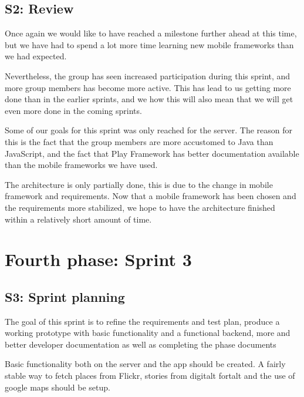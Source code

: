 \documentclass[11pt]{book}
\begin{document}
\subsection{S2: Review}
Once again we would like to have reached a milestone further ahead at this time, but we have had to spend a lot more time learning new mobile frameworks than we had expected. 

Nevertheless, the group has seen increased participation during this sprint, and more group members has become more active. This has lead to us getting more done than in the earlier sprints, and we how this will also mean that we will get even more done in the coming sprints.

Some of our goals for this sprint was only reached for the server. The reason for this is the fact that the group members are more accustomed to Java than JavaScript, and the fact that Play Framework has better documentation available than the mobile frameworks we have used.

The architecture is only partially done, this is due to the change in mobile framework and requirements. Now that a mobile framework has been chosen and the requirements more stabilized, we hope to have the architecture finished within a relatively short amount of time.

\section{Fourth phase: Sprint 3}
\subsection{S3: Sprint planning}
The goal of this sprint is to refine the requirements and test plan, produce a working prototype with basic functionality and a functional backend, more and better developer documentation as well as completing the phase documents

Basic functionality both on the server and the app should be created. A fairly stable way to fetch places from Flickr, stories from digitalt fortalt and the use of google maps should be setup.
\end{document}
